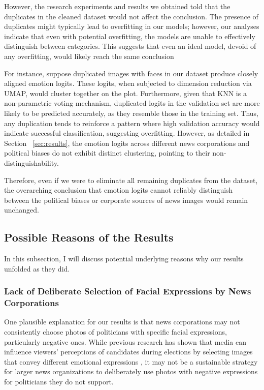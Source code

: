 \documentclass[sigconf]{acmart}
\begin{document}
However, the research experiments and results we obtained told that the duplicates in the cleaned dataset would not affect the conclusion. The presence of duplicates might typically lead to overfitting in our models; however, our analyses indicate that even with potential overfitting, the models are unable to effectively distinguish between categories. This suggests that even an ideal model, devoid of any overfitting, would likely reach the same conclusion

For instance, suppose duplicated images with faces in our dataset produce closely aligned emotion logits. These logits, when subjected to dimension reduction via UMAP, would cluster together on the plot. Furthermore, given that KNN is a non-parametric voting mechanism, duplicated logits in the validation set are more likely to be predicted accurately, as they resemble those in the training set. Thus, any duplication tends to reinforce a pattern where high validation accuracy would indicate successful classification, suggesting overfitting. However, as detailed in Section ~\ref{sec:results}, the emotion logits across different news corporations and political biases do not exhibit distinct clustering, pointing to their non-distinguishability.

Therefore, even if we were to eliminate all remaining duplicates from the dataset, the overarching conclusion that emotion logits cannot reliably distinguish between the political biases or corporate sources of news images would remain unchanged. 



\subsection{Possible Reasons of the Results}
In this subsection, I will discuss potential underlying reasons why our results unfolded as they did.

\subsubsection{Lack of Deliberate Selection of Facial Expressions by News Corporations} 



One plausible explanation for our results is that news corporations may not consistently choose photos of politicians with specific facial expressions, particularly negative ones. While previous research has shown that media can influence viewers' perceptions of candidates during elections by selecting images that convey different emotional expressions \cite{imagebite}, it may not be a sustainable strategy for larger news organizations to deliberately use photos with negative expressions for politicians they do not support.
\end{document}
